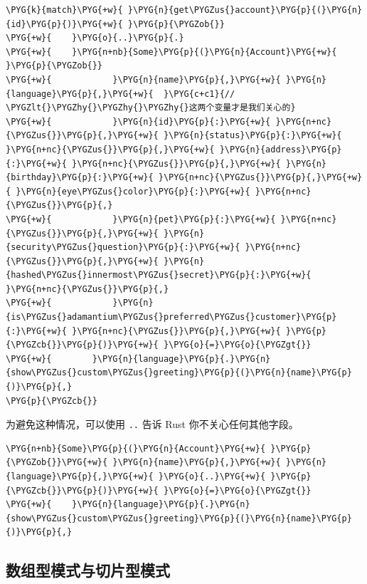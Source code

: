 \begin{Verbatim}[commandchars=\\\{\},breaklines=true,breakanywhere=true,fontsize=\codefont,xleftmargin=17bp]
\PYG{k}{match}\PYG{+w}{ }\PYG{n}{get\PYGZus{}account}\PYG{p}{(}\PYG{n}{id}\PYG{p}{)}\PYG{+w}{ }\PYG{p}{\PYGZob{}}
\PYG{+w}{    }\PYG{o}{..}\PYG{p}{.}
\PYG{+w}{    }\PYG{n+nb}{Some}\PYG{p}{(}\PYG{n}{Account}\PYG{+w}{ }\PYG{p}{\PYGZob{}}
\PYG{+w}{            }\PYG{n}{name}\PYG{p}{,}\PYG{+w}{ }\PYG{n}{language}\PYG{p}{,}\PYG{+w}{  }\PYG{c+c1}{// \PYGZlt{}\PYGZhy{}\PYGZhy{}\PYGZhy{}这两个变量才是我们关心的}
\PYG{+w}{            }\PYG{n}{id}\PYG{p}{:}\PYG{+w}{ }\PYG{n+nc}{\PYGZus{}}\PYG{p}{,}\PYG{+w}{ }\PYG{n}{status}\PYG{p}{:}\PYG{+w}{ }\PYG{n+nc}{\PYGZus{}}\PYG{p}{,}\PYG{+w}{ }\PYG{n}{address}\PYG{p}{:}\PYG{+w}{ }\PYG{n+nc}{\PYGZus{}}\PYG{p}{,}\PYG{+w}{ }\PYG{n}{birthday}\PYG{p}{:}\PYG{+w}{ }\PYG{n+nc}{\PYGZus{}}\PYG{p}{,}\PYG{+w}{ }\PYG{n}{eye\PYGZus{}color}\PYG{p}{:}\PYG{+w}{ }\PYG{n+nc}{\PYGZus{}}\PYG{p}{,}
\PYG{+w}{            }\PYG{n}{pet}\PYG{p}{:}\PYG{+w}{ }\PYG{n+nc}{\PYGZus{}}\PYG{p}{,}\PYG{+w}{ }\PYG{n}{security\PYGZus{}question}\PYG{p}{:}\PYG{+w}{ }\PYG{n+nc}{\PYGZus{}}\PYG{p}{,}\PYG{+w}{ }\PYG{n}{hashed\PYGZus{}innermost\PYGZus{}secret}\PYG{p}{:}\PYG{+w}{ }\PYG{n+nc}{\PYGZus{}}\PYG{p}{,}
\PYG{+w}{            }\PYG{n}{is\PYGZus{}adamantium\PYGZus{}preferred\PYGZus{}customer}\PYG{p}{:}\PYG{+w}{ }\PYG{n+nc}{\PYGZus{}}\PYG{p}{,}\PYG{+w}{ }\PYG{p}{\PYGZcb{}}\PYG{p}{)}\PYG{+w}{ }\PYG{o}{=}\PYG{o}{\PYGZgt{}}
\PYG{+w}{        }\PYG{n}{language}\PYG{p}{.}\PYG{n}{show\PYGZus{}custom\PYGZus{}greeting}\PYG{p}{(}\PYG{n}{name}\PYG{p}{)}\PYG{p}{,}
\PYG{p}{\PYGZcb{}}
\end{Verbatim}

为避免这种情况，可以使用 \texttt{..} 告诉 Rust 你不关心任何其他字段。

\begin{Verbatim}[commandchars=\\\{\},breaklines=true,breakanywhere=true,fontsize=\codefont,xleftmargin=17bp]
\PYG{n+nb}{Some}\PYG{p}{(}\PYG{n}{Account}\PYG{+w}{ }\PYG{p}{\PYGZob{}}\PYG{+w}{ }\PYG{n}{name}\PYG{p}{,}\PYG{+w}{ }\PYG{n}{language}\PYG{p}{,}\PYG{+w}{ }\PYG{o}{..}\PYG{+w}{ }\PYG{p}{\PYGZcb{}}\PYG{p}{)}\PYG{+w}{ }\PYG{o}{=}\PYG{o}{\PYGZgt{}}
\PYG{+w}{    }\PYG{n}{language}\PYG{p}{.}\PYG{n}{show\PYGZus{}custom\PYGZus{}greeting}\PYG{p}{(}\PYG{n}{name}\PYG{p}{)}\PYG{p}{,}
\end{Verbatim}

\subsection{数组型模式与切片型模式}

